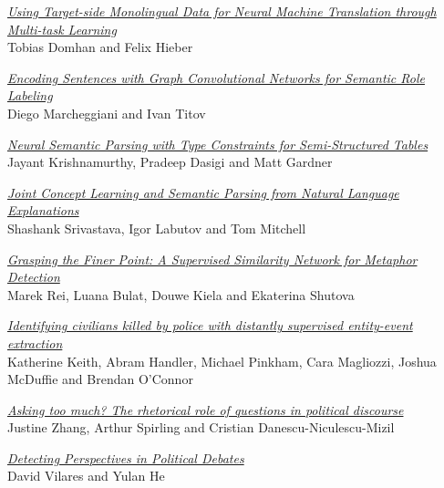 \hyperlink{page.1499}{\em Using Target-side Monolingual Data for Neural Machine Translation through Multi-task Learning}\samepage \\
\hspace*{7mm} Tobias Domhan and Felix Hieber\dotfill {}

\hyperlink{page.1505}{\em Encoding Sentences with Graph Convolutional Networks for Semantic Role Labeling}\samepage \\
\hspace*{7mm} Diego Marcheggiani and Ivan Titov\dotfill {}

\hyperlink{page.1515}{\em Neural Semantic Parsing with Type Constraints for Semi-Structured Tables}\samepage \\
\hspace*{7mm} Jayant Krishnamurthy, Pradeep Dasigi and Matt Gardner\dotfill {}

\hyperlink{page.1526}{\em Joint Concept Learning and Semantic Parsing from Natural Language Explanations}\samepage \\
\hspace*{7mm} Shashank Srivastava, Igor Labutov and Tom Mitchell\dotfill {}

\hyperlink{page.1536}{\em Grasping the Finer Point: A Supervised Similarity Network for Metaphor Detection}\samepage \\
\hspace*{7mm} Marek Rei, Luana Bulat, Douwe Kiela and Ekaterina Shutova\dotfill {}

\hyperlink{page.1546}{\em Identifying civilians killed by police with distantly supervised entity-event extraction}\samepage \\
\hspace*{7mm} Katherine Keith, Abram Handler, Michael Pinkham, Cara Magliozzi, Joshua McDuffie and Brendan O'Connor\dotfill {}

\hyperlink{page.1557}{\em Asking too much? The rhetorical role of questions in political discourse}\samepage \\
\hspace*{7mm} Justine Zhang, Arthur Spirling and Cristian Danescu-Niculescu-Mizil\dotfill {}

\hyperlink{page.1572}{\em Detecting Perspectives in Political Debates}\samepage \\
\hspace*{7mm} David Vilares and Yulan He\dotfill {}

